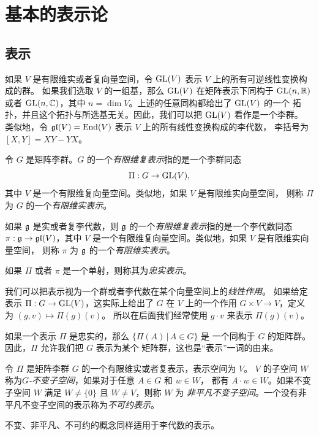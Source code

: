 \chapter{基本的表示论}

\section{表示}

如果 $V$ 是有限维实或者复向量空间，令 $\operatorname{GL}(V)$ 表示 $V$ 上的所有可逆线性变换构成的群。
如果我们选取 $V$ 的一组基，那么 $\operatorname{GL}(V)$ 在矩阵表示下同构于 $\operatorname{GL}(n,\mathbb{R})$ 
或者 $\operatorname{GL}(n,\mathbb{C})$，其中 $n=\dim V$。上述的任意同构都给出了 $\operatorname{GL}(V)$ 的一个
拓扑，并且这个拓扑与所选基无关。因此，我们可以把 $\operatorname{GL}(V)$ 看作是一个李群。
类似地，令 $\mathfrak{gl}(V)=\operatorname{End}(V)$ 表示 $V$ 上的所有线性变换构成的李代数，
李括号为 $[X,Y]=XY-YX$。

\begin{definition}
  令 $G$ 是矩阵李群。$G$ 的一个\emph{有限维复表示}指的是一个李群同态
  \[
    \Pi:G\to \operatorname{GL}(V),
  \]
  其中 $V$ 是一个有限维复向量空间。类似地，如果 $V$ 是有限维实向量空间，
  则称 $\Pi$ 为 $G$ 的一个\emph{有限维实表示}。

  如果 $\mathfrak{g}$ 是实或者复李代数，则 $\mathfrak{g}$ 的一个\emph{有限维复表示}指的是一个李代数同态
  $\pi:\mathfrak{g}\to\mathfrak{gl}(V)$，其中 $V$ 是一个有限维复向量空间。类似地，如果 $V$ 是有限维实向量空间，
  则称 $\pi$ 为 $\mathfrak{g}$ 的一个\emph{有限维实表示}。

  如果 $\Pi$ 或者 $\pi$ 是一个单射，则称其为\emph{忠实表示}。
\end{definition}

我们可以把表示视为一个群或者李代数在某个向量空间上的\emph{线性作用}。
如果给定表示 $\Pi:G\to \operatorname{GL}(V)$，这实际上给出了 $G$ 在 $V$ 上的一个作用
$G\times V\to V$，定义为 $(g,v)\mapsto \Pi(g)(v)$。
所以在后面我们经常使用 $g\cdot v$ 来表示 $\Pi(g)(v)$。

如果一个表示 $\Pi$ 是忠实的，那么 $\{\Pi(A)\,|\, A\in G\}$ 是
一个同构于 $G$ 的矩阵群。因此，$\Pi$ 允许我们把 $G$ 表示为某个
矩阵群，这也是“表示”一词的由来。

\begin{definition}
  令 $\Pi$ 是矩阵李群 $G$ 的一个有限维实或者复表示，表示空间为 $V$。
  $V$ 的子空间 $W$ 称为\emph{$G$-不变子空间}，如果对于任意 $A\in G$ 和 $w\in W$，
  都有 $A\cdot w\in W$。如果不变子空间 $W$ 满足 $W\neq \{0\}$ 且 $W\neq V$，则称 $W$ 为
  \emph{非平凡不变子空间}。一个没有非平凡不变子空间的表示称为\emph{不可约表示}。

  不变、非平凡、不可约的概念同样适用于李代数的表示。
\end{definition}

